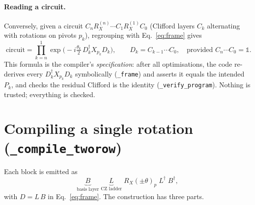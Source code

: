 \documentclass[11pt]{article}
\newcommand{\RX}{R_X}
\newcommand{\code}[1]{\texttt{#1}}
\begin{document}
\paragraph{Reading a circuit.}
Conversely, given a circuit
$C_n \RX^{(n)} \cdots C_1 \RX^{(1)} C_0$ (Clifford layers $C_k$
alternating with rotations on pivots $p_k$), regrouping with
Eq.~\eqref{eq:frame} gives
\begin{equation}
\label{eq:regroup}
\boxed{\;
\text{circuit} = \prod_{k=n}^{1}
  \exp\!\Big(-i\tfrac{\theta_k}{2}\, D_k^{\dagger} X_{p_k} D_k\Big),
\qquad
D_k = C_{k-1}\cdots C_0,
\quad\text{provided } C_n\cdots C_0=\mathbb{1}. \;}
\end{equation}
This formula is the compiler's \emph{specification}: after all
optimisations, the code re-derives every $D_k^{\dagger}X_{p_k}D_k$
symbolically (\code{\_frame}) and asserts it equals the intended $P_k$,
and checks the residual Clifford is the identity
(\code{\_verify\_program}). Nothing is trusted; everything is checked.

\section{Compiling a single rotation (\code{\_compile\_tworow})}
Each block is emitted as
\begin{equation}
  \underbrace{B}_{\text{basis layer}}\;
  \underbrace{L}_{\text{CZ ladder}}\;
  \RX(\pm\theta)_p\;
  L^{\dagger}\; B^{\dagger},
\end{equation}
with $D = L\,B$ in Eq.~\eqref{eq:frame}. The construction has three parts.
\end{document}
